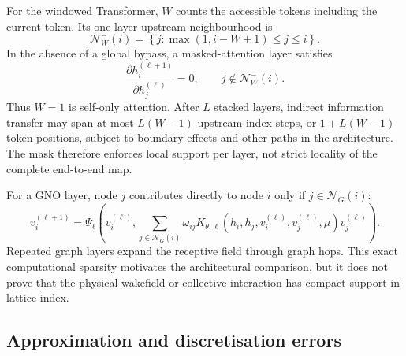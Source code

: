 \documentclass[11pt,a4paper]{article}
\begin{document}
\begin{sloppypar}
For the windowed Transformer, \(W\) counts the accessible tokens including the current token. Its one-layer upstream neighbourhood is
\begin{equation}
    \mathcal{N}_{W}^{-}(i)
    =
    \left\{
        j:\max(1,i-W+1)\leq j\leq i
    \right\}.
    \label{eq:app_window_neighbourhood}
\end{equation}
In the absence of a global bypass, a masked-attention layer satisfies
\begin{equation}
    \frac{\partial h_i^{(\ell+1)}}
    {\partial h_j^{(\ell)}}=0,
    \qquad
    j\notin\mathcal{N}_{W}^{-}(i).
    \label{eq:app_window_jacobian}
\end{equation}
Thus \(W=1\) is self-only attention. After \(L\) stacked layers, indirect information transfer may span at most \(L(W-1)\) upstream index steps, or \(1+L(W-1)\) token positions, subject to boundary effects and other paths in the architecture. The mask therefore enforces local support per layer, not strict locality of the complete end-to-end map.

For a GNO layer, node \(j\) contributes directly to node \(i\) only if \(j\in\mathcal{N}_{G}(i)\):
\begin{equation}
    v_i^{(\ell+1)}
    =
    \Psi_{\ell}\!\left(
        v_i^{(\ell)},
        \sum_{j\in\mathcal{N}_{G}(i)}
        \omega_{ij}
        K_{\theta,\ell}(h_i,h_j,v_i^{(\ell)},v_j^{(\ell)},\mu)
        v_j^{(\ell)}
    \right).
    \label{eq:app_gno_support}
\end{equation}
Repeated graph layers expand the receptive field through graph hops. This exact computational sparsity motivates the architectural comparison, but it does not prove that the physical wakefield or collective interaction has compact support in lattice index.

\subsection{Approximation and discretisation errors}


\end{sloppypar}
\end{document}
